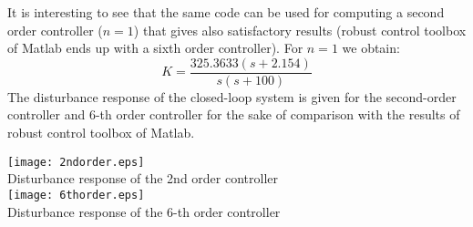 \documentclass [12pt , a4paper] {report}
\begin{document}
It is interesting to see that the same code can be used for computing a second order controller ($n=1$) that gives also satisfactory results (robust control toolbox of Matlab ends up with a sixth order controller). For $n=1$ we obtain:
$$
K=\frac{325.3633 (s+2.154)}{s (s+100)}
$$
The disturbance response of the closed-loop system is given for the second-order controller and 6-th order controller for the sake of comparison with the results of robust control toolbox of Matlab.
\begin{center}
\texttt{[image: 2ndorder.eps]} \\
Disturbance response of the 2nd order controller\\

\texttt{[image: 6thorder.eps]} \\
Disturbance response of the 6-th order controller
\end{center}
\end{document}
